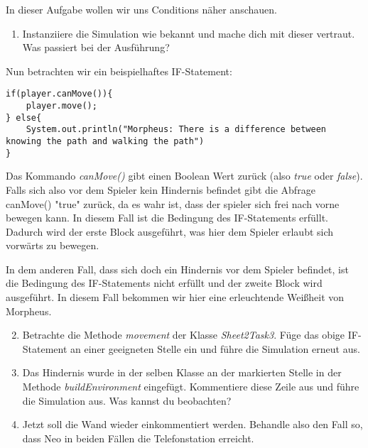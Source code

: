 

In dieser Aufgabe wollen wir uns Conditions näher anschauen.

\begin{enumerate}                           
    \item Instanziiere die Simulation wie bekannt und mache dich mit dieser vertraut.
        Was passiert bei der Ausführung?
\end{enumerate}


\begin{Infobox}[IF-Condition]
    Nun betrachten wir ein beispielhaftes IF-Statement:

    \begin{lstlisting}[breaklines=true, numbers=none]
if(player.canMove()){
    player.move();
} else{
    System.out.println("Morpheus: There is a difference between knowing the path and walking the path")
}
    \end{lstlisting}

    Das Kommando \textit{canMove()} gibt einen Boolean Wert zurück (also \textit{true} oder \textit{false}).
    Falls sich also vor dem Spieler kein Hindernis befindet gibt die Abfrage canMove() "true" zurück, da es wahr ist, dass der spieler sich frei nach vorne bewegen kann.
    In diesem Fall ist die Bedingung des IF-Statements erfüllt. 
    Dadurch wird der erste Block ausgeführt, was hier dem Spieler erlaubt sich vorwärts zu bewegen. 

    In dem anderen Fall, dass sich doch ein Hindernis vor dem Spieler befindet, ist die Bedingung des IF-Statements nicht erfüllt und der zweite Block wird ausgeführt.
    In diesem Fall bekommen wir hier eine erleuchtende Weißheit von Morpheus.
\end{Infobox}


\begin{enumerate} \setcounter{enumi}{1}
    \item Betrachte die Methode \textit{movement} der Klasse \textit{Sheet2Task3}. 
        Füge das obige IF-Statement an einer geeigneten Stelle ein und führe die Simulation erneut aus.
    \item Das Hindernis wurde in der selben Klasse an der markierten Stelle in der Methode \textit{buildEnvironment} eingefügt.
        Kommentiere diese Zeile aus und führe die Simulation aus. Was kannst du beobachten?
    \item Jetzt soll die Wand wieder einkommentiert werden. Behandle also den  Fall so, dass Neo in beiden Fällen die Telefonstation erreicht.

\end{enumerate}
